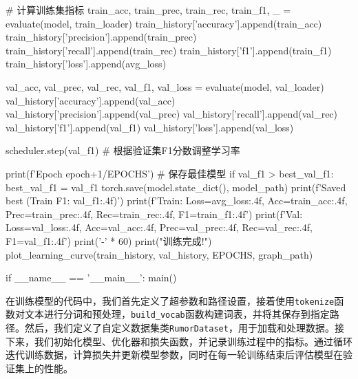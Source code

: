 \begin{codeblock}[language=Python]
        # 计算训练集指标
        train_acc, train_prec, train_rec, train_f1, _ = evaluate(model, train_loader)
        train_history['accuracy'].append(train_acc)
        train_history['precision'].append(train_prec)
        train_history['recall'].append(train_rec)
        train_history['f1'].append(train_f1)
        train_history['loss'].append(avg_loss)

        val_acc, val_prec, val_rec, val_f1, val_loss = evaluate(model, val_loader)
        val_history['accuracy'].append(val_acc)
        val_history['precision'].append(val_prec)
        val_history['recall'].append(val_rec)
        val_history['f1'].append(val_f1)
        val_history['loss'].append(val_loss)
        
        scheduler.step(val_f1)  # 根据验证集F1分数调整学习率
        
        print(f'Epoch {epoch+1}/{EPOCHS}')
        # 保存最佳模型
        if val_f1 > best_val_f1:
            best_val_f1 = val_f1
            torch.save(model.state_dict(), model_path)
            print(f'Saved best (Train F1: {val_f1:.4f})')
        print(f'Train: Loss={avg_loss:.4f}, Acc={train_acc:.4f}, Prec={train_prec:.4f}, Rec={train_rec:.4f}, F1={train_f1:.4f}')
        print(f'Val: Loss={val_loss:.4f}, Acc={val_acc:.4f}, Prec={val_prec:.4f}, Rec={val_rec:.4f}, F1={val_f1:.4f}')
        print('-' * 60)
    print("\n 训练完成!")
    plot_learning_curve(train_history, val_history, EPOCHS, graph_path)
    
if __name__ == '__main__':
    main()
\end{codeblock}

在训练模型的代码中，我们首先定义了超参数和路径设置，接着使用\verb|tokenize|函数对文本进行分词和预处理，\verb|build_vocab|函数构建词表，并将其保存到指定路径。然后，我们定义了自定义数据集类\verb|RumorDataset|，用于加载和处理数据。接下来，我们初始化模型、优化器和损失函数，并记录训练过程中的指标。通过循环迭代训练数据，计算损失并更新模型参数，同时在每一轮训练结束后评估模型在验证集上的性能。

\vspace{1em}
